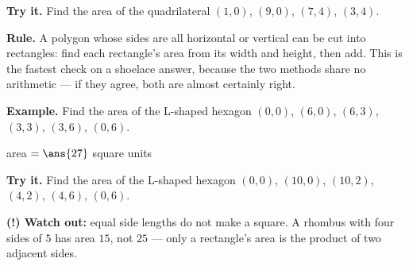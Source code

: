 \documentclass[12pt]{article}
\begin{document}
\begin{tryitbox}
\textbf{Try it.} Find the area of the quadrilateral $(1,0)$, $(9,0)$, $(7,4)$,
$(3,4)$.\\[2pt]
\end{tryitbox}


\begin{formulabox}
\textbf{Rule.} A polygon whose sides are all horizontal or vertical can be cut
into rectangles: find each rectangle's area from its width and height, then add.
This is the fastest check on a shoelace answer, because the two methods share no
arithmetic --- if they agree, both are almost certainly right.
\end{formulabox}

\begin{examplebox}
\textbf{Example.} Find the area of the L-shaped hexagon $(0,0)$, $(6,0)$,
$(6,3)$, $(3,3)$, $(3,6)$, $(0,6)$.

area $= \ans{27}$ square units
\end{examplebox}

\begin{tryitbox}
\textbf{Try it.} Find the area of the L-shaped hexagon $(0,0)$, $(10,0)$,
$(10,2)$, $(4,2)$, $(4,6)$, $(0,6)$.\\[2pt]
\end{tryitbox}

\begin{watchoutbox}
\textbf{(!) Watch out:} equal side lengths do not make a square. A rhombus with
four sides of $5$ has area $15$, not $25$ --- only a rectangle's area is the
product of two adjacent sides.
\end{watchoutbox}
\end{document}
